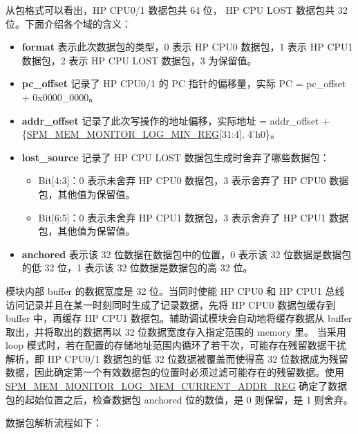 \documentclass[main\_\_CN.tex]{subfiles}
\begin{document}
从包格式可以看出，HP CPU0/1 数据包共 64 位， HP CPU LOST 数据包共 32 位。下面介绍各个域的含义：
\begin{itemize}
    \item {\bfseries format} 表示此次数据包的类型，0 表示 HP CPU0 数据包，1 表示 HP CPU1 数据包，2 表示 HP CPU LOST 数据包，3 为保留值。
    \item {\bfseries pc\_offset} 记录了 HP CPU0/1 的 PC 指针的偏移量，实际 PC = pc\_offset + 0x0000\_0000。
    \item {\bfseries addr\_offset} 记录了此次写操作的地址偏移，实际地址 = addr\_offset + \{\hyperref[regdesc:SPMMEMMONITORLOGMINREG]{SPM\_MEM\_MONITOR\_LOG\_MIN\_REG}[31:4], 4'h0\}。
    \item {\bfseries lost\_source} 记录了 HP CPU LOST 数据包生成时舍弃了哪些数据包：
    \begin{itemize}
        \item Bit[4:3]：0 表示未舍弃 HP CPU0 数据包，3 表示舍弃了 HP CPU0 数据包，其他值为保留值。
        \item Bit[6:5]：0 表示未舍弃 HP CPU1 数据包，3 表示舍弃了 HP CPU1 数据包，其他值为保留值。
    \end{itemize}
    \item {\bfseries anchored} 表示该 32 位数据在数据包中的位置，0 表示该 32 位数据是数据包的低 32 位，1 表示该 32 位数据是数据包的高 32 位。

\end{itemize}
模块内部 buffer 的数据宽度是 32 位。当同时使能 HP CPU0 和 HP CPU1 总线访问记录并且在某一时刻同时生成了记录数据，先将 HP CPU0 数据包缓存到 buffer 中，再缓存 HP CPU1 数据包。辅助调试模块会自动地将缓存数据从 buffer 取出，并将取出的数据再以 32 位数据宽度存入指定范围的 memory 里。
当采用 loop 模式时，若在配置的存储地址范围内循环了若干次，可能存在残留数据干扰解析，即 HP CPU0/1 数据包的低 32 位数据被覆盖而使得高 32 位数据成为残留数据，因此确定第一个有效数据包的位置时必须过滤可能存在的残留数据。使用 \hyperref[regdesc:SPMMEMMONITORLOGMEMCURRENTADDRREG]{SPM\_MEM\_MONITOR\_LOG\_MEM\_CURRENT\_ADDR\_REG} 确定了数据包的起始位置之后，检查数据包 anchored 位的数值，是 0 则保留，是 1 则舍弃。

数据包解析流程如下：
\end{document}
